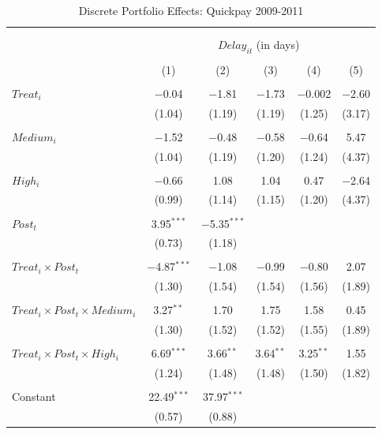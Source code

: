 \documentclass[]{article}
\begin{document}
\begin{table}[H] \centering 
  \caption{Discrete Portfolio Effects: Quickpay 2009-2011} 
  \label{} 
\small 
\begin{tabular}{@{\extracolsep{-2pt}}lccccc} 
\\[-1.8ex]\hline 
\hline \\[-1.8ex] 
\\[-1.8ex] & \multicolumn{5}{c}{$Delay_{it}$ (in days)} \\ 
\\[-1.8ex] & (1) & (2) & (3) & (4) & (5)\\ 
\hline \\[-1.8ex] 
 $Treat_i$ & $-$0.04 & $-$1.81 & $-$1.73 & $-$0.002 & $-$2.60 \\ 
  & (1.04) & (1.19) & (1.19) & (1.25) & (3.17) \\ 
  & & & & & \\ 
 $Medium_i$ & $-$1.52 & $-$0.48 & $-$0.58 & $-$0.64 & 5.47 \\ 
  & (1.04) & (1.19) & (1.20) & (1.24) & (4.37) \\ 
  & & & & & \\ 
 $High_i$ & $-$0.66 & 1.08 & 1.04 & 0.47 & $-$2.64 \\ 
  & (0.99) & (1.14) & (1.15) & (1.20) & (4.37) \\ 
  & & & & & \\ 
 $Post_t$ & 3.95$^{***}$ & $-$5.35$^{***}$ &  &  &  \\ 
  & (0.73) & (1.18) &  &  &  \\ 
  & & & & & \\ 
 $Treat_i \times Post_t$ & $-$4.87$^{***}$ & $-$1.08 & $-$0.99 & $-$0.80 & 2.07 \\ 
  & (1.30) & (1.54) & (1.54) & (1.56) & (1.89) \\ 
  & & & & & \\ 
 $Treat_i \times Post_t \times Medium_i$ & 3.27$^{**}$ & 1.70 & 1.75 & 1.58 & 0.45 \\ 
  & (1.30) & (1.52) & (1.52) & (1.55) & (1.89) \\ 
  & & & & & \\ 
 $Treat_i \times Post_t \times High_i$ & 6.69$^{***}$ & 3.66$^{**}$ & 3.64$^{**}$ & 3.25$^{**}$ & 1.55 \\ 
  & (1.24) & (1.48) & (1.48) & (1.50) & (1.82) \\ 
  & & & & & \\ 
 Constant & 22.49$^{***}$ & 37.97$^{***}$ &  &  &  \\ 
  & (0.57) & (0.88) &  &  &  \\ 

\end{tabular}
\end{table}
\end{document}
